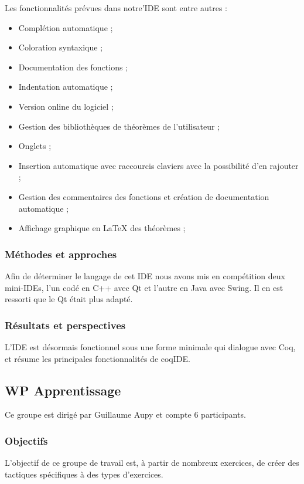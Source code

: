 \documentclass[a4paper,10pt]{article}
\begin{document}
Les fonctionnalités prévues dans notre'IDE sont entre autres :
   \begin{itemize}
   \item Complétion automatique ;
   \item Coloration syntaxique ;
   \item Documentation des fonctions ;
   \item Indentation automatique ;
   \item Version online du logiciel ;
   \item Gestion des bibliothèques de théorèmes de l'utilisateur ;
   \item Onglets ;
   \item Insertion automatique avec raccourcis claviers avec la possibilité d'en rajouter ;
   \item Gestion des commentaires des fonctions et création de documentation automatique ;
   \item Affichage graphique en \LaTeX{} des théorèmes ;
\end{itemize}

\subsubsection{Méthodes et approches}
Afin de déterminer le langage de cet IDE nous avons mis en compétition deux mini-IDEs, l'un codé en C++ avec Qt et l'autre en Java avec Swing. Il en est ressorti que le Qt était plus adapté.

\subsubsection{Résultats et perspectives}
L'IDE est désormais fonctionnel sous une forme minimale qui dialogue avec Coq, et résume les principales fonctionnalités de coqIDE.


\subsection{WP Apprentissage}

Ce groupe est dirigé par Guillaume Aupy et compte 6 participants.

\subsubsection{Objectifs}
L'objectif de ce groupe de travail est, à partir de nombreux exercices, de créer des tactiques spécifiques à des types d'exercices.
\end{document}
